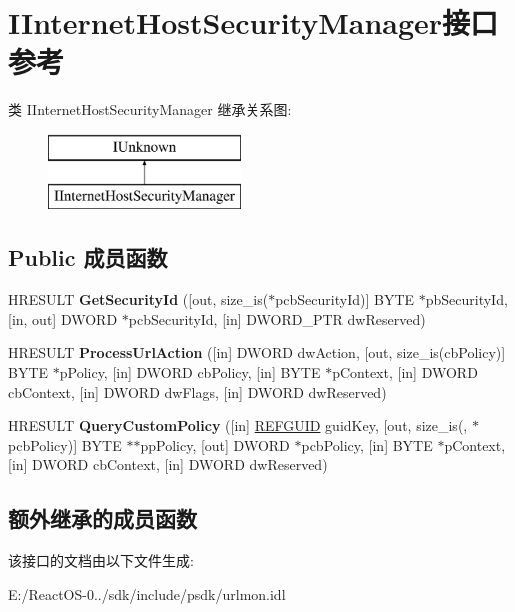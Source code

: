 \hypertarget{interface_i_internet_host_security_manager}{}\section{I\+Internet\+Host\+Security\+Manager接口 参考}
\label{interface_i_internet_host_security_manager}
类 I\+Internet\+Host\+Security\+Manager 继承关系图\+:\begin{figure}[H]
\begin{center}
\leavevmode
\includegraphics[height=2.000000cm]{interface_i_internet_host_security_manager}
\end{center}
\end{figure}
\subsection*{Public 成员函数}
\begin{DoxyCompactItemize}
\item 
\mbox{\label{interface_i_internet_host_security_manager_a27a3cc03345f1b24cf8af9dcfd136821}} 
H\+R\+E\+S\+U\+LT {\bfseries Get\+Security\+Id} (\mbox{[}out, size\+\_\+is($\ast$pcb\+Security\+Id)\mbox{]} B\+Y\+TE $\ast$pb\+Security\+Id, \mbox{[}in, out\mbox{]} D\+W\+O\+RD $\ast$pcb\+Security\+Id, \mbox{[}in\mbox{]} D\+W\+O\+R\+D\+\_\+\+P\+TR dw\+Reserved)
\item 
\mbox{\label{interface_i_internet_host_security_manager_aad5defaf40e1a0ce4ab17c8169edfc96}} 
H\+R\+E\+S\+U\+LT {\bfseries Process\+Url\+Action} (\mbox{[}in\mbox{]} D\+W\+O\+RD dw\+Action, \mbox{[}out, size\+\_\+is(cb\+Policy)\mbox{]} B\+Y\+TE $\ast$p\+Policy, \mbox{[}in\mbox{]} D\+W\+O\+RD cb\+Policy, \mbox{[}in\mbox{]} B\+Y\+TE $\ast$p\+Context, \mbox{[}in\mbox{]} D\+W\+O\+RD cb\+Context, \mbox{[}in\mbox{]} D\+W\+O\+RD dw\+Flags, \mbox{[}in\mbox{]} D\+W\+O\+RD dw\+Reserved)
\item 
\mbox{\label{interface_i_internet_host_security_manager_a0d1c85b21386f973e7bded965a2da427}} 
H\+R\+E\+S\+U\+LT {\bfseries Query\+Custom\+Policy} (\mbox{[}in\mbox{]} \hyperlink{struct___g_u_i_d}{R\+E\+F\+G\+U\+ID} guid\+Key, \mbox{[}out, size\+\_\+is(, $\ast$pcb\+Policy)\mbox{]} B\+Y\+TE $\ast$$\ast$pp\+Policy, \mbox{[}out\mbox{]} D\+W\+O\+RD $\ast$pcb\+Policy, \mbox{[}in\mbox{]} B\+Y\+TE $\ast$p\+Context, \mbox{[}in\mbox{]} D\+W\+O\+RD cb\+Context, \mbox{[}in\mbox{]} D\+W\+O\+RD dw\+Reserved)
\end{DoxyCompactItemize}
\subsection*{额外继承的成员函数}


该接口的文档由以下文件生成\+:\begin{DoxyCompactItemize}
\item 
E\+:/\+React\+O\+S-\/0../sdk/include/psdk/urlmon.\+idl\end{DoxyCompactItemize}
